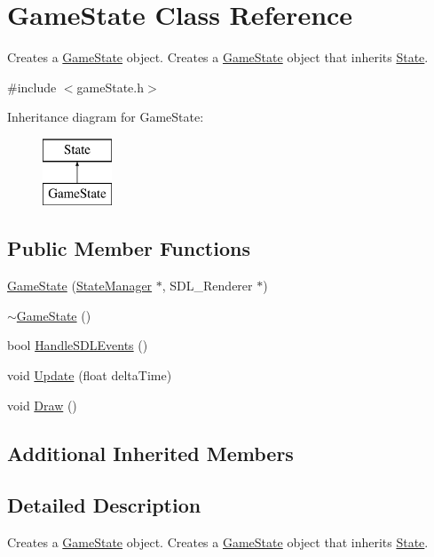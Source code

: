 \hypertarget{class_game_state}{\section{Game\+State Class Reference}
\label{class_game_state}
}


Creates a \hyperlink{class_game_state}{Game\+State} object. Creates a \hyperlink{class_game_state}{Game\+State} object that inherits \hyperlink{class_state}{State}.  




{\ttfamily \#include $<$game\+State.\+h$>$}

Inheritance diagram for Game\+State\+:\begin{figure}[H]
\begin{center}
\leavevmode
\includegraphics[height=2.000000cm]{class_game_state}
\end{center}
\end{figure}
\subsection*{Public Member Functions}
\begin{DoxyCompactItemize}
\item 
\hyperlink{class_game_state_a0e812c09d724c03147ad6721b4d7bd73}{Game\+State} (\hyperlink{class_state_manager}{State\+Manager} $\ast$, S\+D\+L\+\_\+\+Renderer $\ast$)
\item 
\hyperlink{class_game_state_ae623df5042cd0c17daa3394fdcb397b3}{$\sim$\+Game\+State} ()
\item 
bool \hyperlink{class_game_state_a5e2467775e9a941d482e0489295c363d}{Handle\+S\+D\+L\+Events} ()
\item 
void \hyperlink{class_game_state_a2ea32b0cd5f747ef6223d182f415a6c4}{Update} (float delta\+Time)
\item 
void \hyperlink{class_game_state_ab9330b36c7c74d733c2739c025285c64}{Draw} ()
\end{DoxyCompactItemize}
\subsection*{Additional Inherited Members}


\subsection{Detailed Description}
Creates a \hyperlink{class_game_state}{Game\+State} object. Creates a \hyperlink{class_game_state}{Game\+State} object that inherits \hyperlink{class_state}{State}. 

